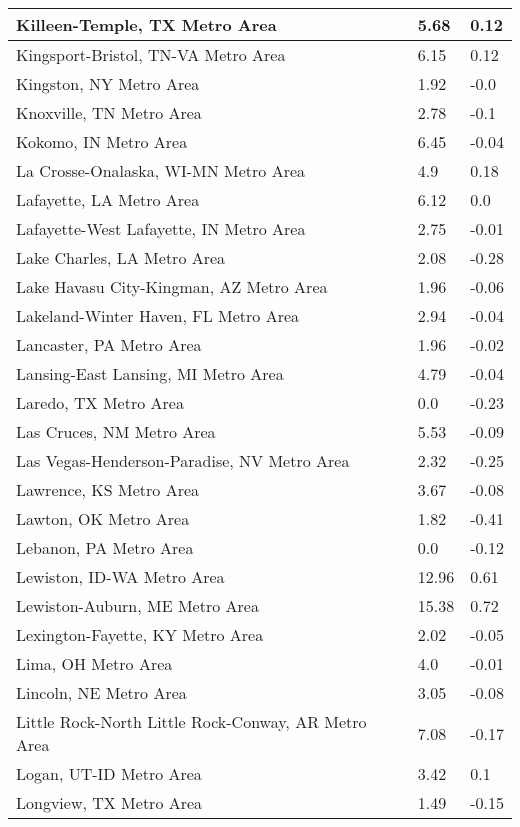 \documentclass[12pt,oneside, letterpaper]{book}
\begin{document}
\begin{longtable}{| p{} | p{} | p{} |}
    Killeen-Temple, TX Metro Area & 5.68 & 0.12 \\ \hline
    Kingsport-Bristol, TN-VA Metro Area & 6.15 & 0.12 \\ \hline
    Kingston, NY Metro Area & 1.92 & -0.0 \\ \hline
    Knoxville, TN Metro Area & 2.78 & -0.1 \\ \hline
    Kokomo, IN Metro Area & 6.45 & -0.04 \\ \hline
    La Crosse-Onalaska, WI-MN Metro Area & 4.9 & 0.18 \\ \hline
    Lafayette, LA Metro Area & 6.12 & 0.0 \\ \hline
    Lafayette-West Lafayette, IN Metro Area & 2.75 & -0.01 \\ \hline
    Lake Charles, LA Metro Area & 2.08 & -0.28 \\ \hline
    Lake Havasu City-Kingman, AZ Metro Area & 1.96 & -0.06 \\ \hline
    Lakeland-Winter Haven, FL Metro Area & 2.94 & -0.04 \\ \hline
    Lancaster, PA Metro Area & 1.96 & -0.02 \\ \hline
    Lansing-East Lansing, MI Metro Area & 4.79 & -0.04 \\ \hline
    Laredo, TX Metro Area & 0.0 & -0.23 \\ \hline
    Las Cruces, NM Metro Area & 5.53 & -0.09 \\ \hline
    Las Vegas-Henderson-Paradise, NV Metro Area & 2.32 & -0.25 \\ \hline
    Lawrence, KS Metro Area & 3.67 & -0.08 \\ \hline
    Lawton, OK Metro Area & 1.82 & -0.41 \\ \hline
    Lebanon, PA Metro Area & 0.0 & -0.12 \\ \hline
    Lewiston, ID-WA Metro Area & 12.96 & 0.61 \\ \hline
    Lewiston-Auburn, ME Metro Area & 15.38 & 0.72 \\ \hline
    Lexington-Fayette, KY Metro Area & 2.02 & -0.05 \\ \hline
    Lima, OH Metro Area & 4.0 & -0.01 \\ \hline
    Lincoln, NE Metro Area & 3.05 & -0.08 \\ \hline
    Little Rock-North Little Rock-Conway, AR Metro Area & 7.08 & -0.17 \\ \hline
    Logan, UT-ID Metro Area & 3.42 & 0.1 \\ \hline
    Longview, TX Metro Area & 1.49 & -0.15 \\ \hline

\end{longtable}
\end{document}
